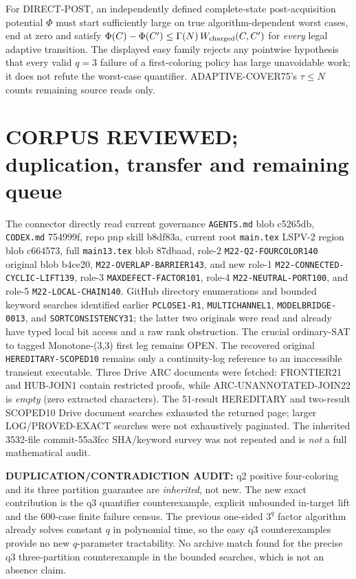 \documentclass[11pt]{article}
\begin{document}
For DIRECT-POST, an independently defined complete-state post-acquisition potential \(\Phi\) must start sufficiently large on true algorithm-dependent worst cases, end at zero and satisfy \(\Phi(C)-\Phi(C')\le\Gamma(N)\,W_{\rm charged}(C,C')\) for \emph{every} legal adaptive transition. The displayed easy family rejects any pointwise hypothesis that every valid \(q=3\) failure of a first-coloring policy has large unavoidable work; it does not refute the worst-case quantifier. ADAPTIVE-COVER75's \(\tau\le N\) counts remaining source reads only.

\section{CORPUS REVIEWED; duplication, transfer and remaining queue}
The connector directly read current governance \texttt{AGENTS.md} blob c5265db, \texttt{CODEX.md} 754999f, repo pnp skill b8df83a, current root \texttt{main.tex} LSPV-2 region blob c664573, full \texttt{main13.tex} blob 87dbaad, role-2 \texttt{M22-Q2-FOURCOLOR140} original blob b4ce20, \texttt{M22-OVERLAP-BARRIER143}, and new role-1 \texttt{M22-CONNECTED-CYCLIC-LIFT139}, role-3 \texttt{MAXDEFECT-FACTOR101}, role-4 \texttt{M22-NEUTRAL-PORT100}, and role-5 \texttt{M22-LOCAL-CHAIN140}. GitHub directory enumerations and bounded keyword searches identified earlier \texttt{PCLOSE1-R1}, \texttt{MULTICHANNEL1}, \texttt{MODELBRIDGE-0013}, and \texttt{SORTCONSISTENCY31}; the latter two originals were read and already have typed local bit access and a raw rank obstruction. The crucial ordinary-SAT to tagged Monotone-(3,3) first leg remains OPEN. The recovered original \texttt{HEREDITARY-SCOPED10} remains only a continuity-log reference to an inaccessible transient executable. Three Drive ARC documents were fetched: FRONTIER21 and HUB-JOIN1 contain restricted proofs, while ARC-UNANNOTATED-JOIN22 is \emph{empty} (zero extracted characters). The 51-result HEREDITARY and two-result SCOPED10 Drive document searches exhausted the returned page; larger LOG/PROVED-EXACT searches were not exhaustively paginated. The inherited 3532-file commit-55a3fcc SHA/keyword survey was not repeated and is \emph{not} a full mathematical audit.

\textbf{DUPLICATION/CONTRADICTION AUDIT:} q2 positive four-coloring and its three partition guarantee are \emph{inherited}, not new. The new exact contribution is the q3 quantifier counterexample, explicit unbounded in-target lift and the 600-case finite failure census. The previous one-sided \(3^q\) factor algorithm already solves constant \(q\) in polynomial time, so the easy q3 counterexamples provide no new \(q\)-parameter tractability. No archive match found for the precise q3 three-partition counterexample in the bounded searches, which is not an absence claim.
\end{document}
